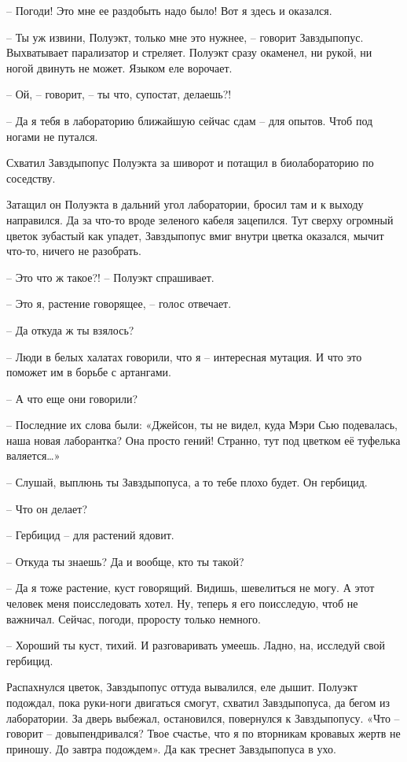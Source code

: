 \documentclass[ebook,oneside,final,openright]{memoir}
\begin{document}
– Погоди! Это мне ее раздобыть надо было! Вот я здесь и оказался.\par
– Ты уж извини, Полуэкт, только мне это нужнее, – говорит Завздыпопус. Выхватывает парализатор и стреляет. Полуэкт сразу окаменел, ни рукой, ни ногой двинуть не может. Языком еле ворочает.\par
– Ой, – говорит, – ты что, супостат, делаешь?!\par
– Да я тебя в лабораторию ближайшую сейчас сдам – для опытов. Чтоб под ногами не путался.\par
Схватил Завздыпопус Полуэкта за шиворот и потащил в биолабораторию по соседству.\par
\par
Затащил он Полуэкта в дальний угол лаборатории, бросил там и к выходу направился. Да за что-то вроде зеленого кабеля зацепился. Тут сверху огромный цветок зубастый как упадет, Завздыпопус вмиг внутри цветка оказался, мычит что-то, ничего не разобрать.\par
\par
– Это что ж такое?! – Полуэкт спрашивает.\par
– Это я, растение говорящее, – голос отвечает.\par
– Да откуда ж ты взялось?\par
– Люди в белых халатах говорили, что я – интересная мутация. И что это поможет им в борьбе с артангами.\par
– А что еще они говорили?\par
– Последние их слова были: «Джейсон, ты не видел, куда Мэри Сью подевалась, наша новая лаборантка? Она просто гений! Странно, тут под цветком её туфелька валяется…»\par
– Слушай, выплюнь ты Завздыпопуса, а то тебе плохо будет. Он гербицид.\par
– Что он делает?\par
– Гербицид – для растений ядовит.\par
– Откуда ты знаешь? Да и вообще, кто ты такой?\par
– Да я тоже растение, куст говорящий. Видишь, шевелиться не могу. А этот человек меня поисследовать хотел. Ну, теперь я его поисследую, чтоб не важничал. Сейчас, погоди, проросту только немного.\par
– Хороший ты куст, тихий. И разговаривать умеешь. Ладно, на, исследуй свой гербицид.\par
\par
Распахнулся цветок, Завздыпопус оттуда вывалился, еле дышит. Полуэкт подождал, пока руки-ноги двигаться смогут, схватил Завздыпопуса, да бегом из лаборатории. За дверь выбежал, остановился, повернулся к Завздыпопусу. «Что – говорит – довыпендривался? Твое счастье, что я по вторникам кровавых жертв не приношу. До завтра подождем». Да как треснет Завздыпопуса в ухо.\par
\end{document}
